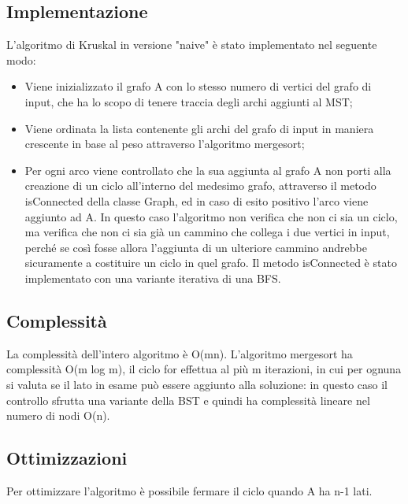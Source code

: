 \subsection{Implementazione}
L'algoritmo di Kruskal in versione "naive" è stato implementato nel seguente modo:
\begin{itemize}
	\item Viene inizializzato il grafo A con lo stesso numero di vertici del grafo di input, che ha lo scopo di tenere traccia degli archi aggiunti al MST;
	\item Viene ordinata la lista contenente gli archi del grafo di input in maniera crescente in base al peso attraverso l'algoritmo mergesort;
	\item Per ogni arco viene controllato che la sua aggiunta al grafo A non porti alla creazione di un ciclo all'interno del medesimo grafo, attraverso il metodo isConnected della classe Graph, ed in caso di esito positivo l'arco viene aggiunto ad A. In questo caso l'algoritmo non verifica che non ci sia un ciclo, ma verifica che non ci sia già un cammino che collega i due vertici in input, perché se così fosse allora l'aggiunta di un ulteriore cammino andrebbe sicuramente a costituire un ciclo in quel grafo. Il metodo isConnected è stato implementato con una variante iterativa di una BFS.
\end{itemize}

\subsection{Complessità}
La complessità dell'intero algoritmo è O(mn). L'algoritmo mergesort ha complessità O(m log m), il ciclo for effettua al più m iterazioni, in cui per ognuna si valuta se il lato in esame può essere aggiunto alla soluzione: in questo caso il controllo sfrutta una variante della BST e quindi ha complessità lineare nel numero di nodi O(n).

\subsection{Ottimizzazioni}
Per ottimizzare l'algoritmo è possibile fermare il ciclo quando A ha n-1 lati.

\pagebreak